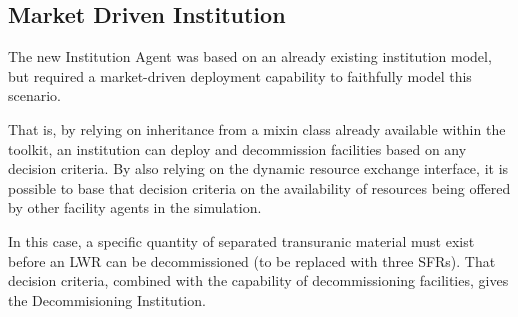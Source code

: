 
\subsection{Market Driven Institution}
\label{sec:mktdriveninst}
The new Institution Agent was based on an already existing institution
model, but required a market-driven deployment capability to
faithfully model this scenario. 

That is, by relying on inheritance from a mixin class already available within 
the \Cyclus toolkit, an institution can deploy and decommission facilities 
based on any decision criteria. By also relying on the dynamic resource 
exchange interface, it is possible to base that decision criteria on the 
availability of resources being offered by other facility agents in the 
simulation. 

In this case, a specific quantity of separated transuranic material must exist 
before an LWR can be decommissioned (to be replaced with three SFRs). That 
decision criteria, combined with the capability of decommissioning facilities, 
gives the Decommisioning Institution. 


